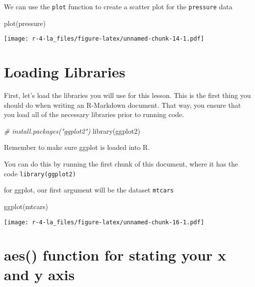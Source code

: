 \documentclass[
]{book}
\newenvironment{Shaded}{\begin{snugshade}}{\end{snugshade}}
\newcommand{\CommentTok}[1]{\textcolor[rgb]{0.56,0.35,0.01}{\textit{#1}}}
\newcommand{\FunctionTok}[1]{\textcolor[rgb]{0.00,0.00,0.00}{#1}}
\newcommand{\NormalTok}[1]{#1}
\begin{document}
We can use the \texttt{plot} function to create a scatter plot for the \texttt{pressure} data

\begin{Shaded}
\begin{Highlighting}[]
\FunctionTok{plot}\NormalTok{(pressure)}
\end{Highlighting}
\end{Shaded}

\texttt{[image: r-4-la\_files/figure-latex/unnamed-chunk-14-1.pdf]}

\hypertarget{loading-libraries}{%
\section{Loading Libraries}\label{loading-libraries}}

First, let's load the libraries you will use for this lesson. This is the first thing you should do when writing an R-Markdown document. That way, you ensure that you load all of the necessary libraries prior to running code.

\begin{Shaded}
\begin{Highlighting}[]
\CommentTok{\# install.packages("ggplot2")}
\FunctionTok{library}\NormalTok{(ggplot2)}
\end{Highlighting}
\end{Shaded}

Remember to make sure ggplot is loaded into R.

You can do this by running the first chunk of this document, where it has the code \texttt{library(ggplot2)}

for ggplot, our first argument will be the dataset \texttt{mtcars}

\begin{Shaded}
\begin{Highlighting}[]
\FunctionTok{ggplot}\NormalTok{(mtcars)}
\end{Highlighting}
\end{Shaded}

\texttt{[image: r-4-la\_files/figure-latex/unnamed-chunk-16-1.pdf]}

\hypertarget{aes-function-for-stating-your-x-and-y-axis}{%
\section{aes() function for stating your x and y axis}\label{aes-function-for-stating-your-x-and-y-axis}}
\end{document}
